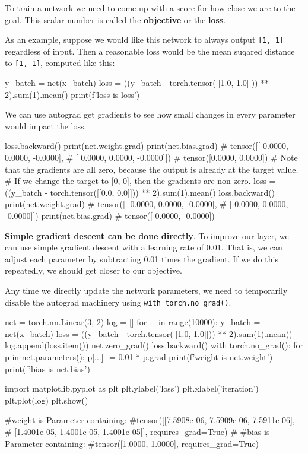 To train a network we need to come up with a score for how close we are to the goal. This scalar number is called the \textbf{objective} or the \textbf{loss}. 

As an example, suppose we would like this network to always output \texttt{[1, 1]} regardless of input. Then a reasonable loss would be the mean suqared distance to \texttt{[1, 1]}, computed like this:
\begin{codeblock}[language=python]
y_batch = net(x_batch)
loss = ((y_batch - torch.tensor([[1.0, 1.0]])) ** 2).sum(1).mean()
print(f'loss is {loss}')
\end{codeblock}

We can use autograd get gradients to see how small changes in every parameter would impact the loss. 

\begin{codeblock}[language=python]
loss.backward()
print(net.weight.grad)
print(net.bias.grad)
# tensor([[ 0.0000,  0.0000, -0.0000],
#        [ 0.0000,  0.0000, -0.0000]])
# tensor([0.0000, 0.0000])
# Note that the gradients are all zero, because the output is already at the target value.
# If we change the target to [0, 0], then the gradients are non-zero.
loss = ((y_batch - torch.tensor([[0.0, 0.0]])) ** 2).sum(1).mean()
loss.backward()
print(net.weight.grad)
# tensor([[ 0.0000,  0.0000, -0.0000],
#        [ 0.0000,  0.0000, -0.0000]])
print(net.bias.grad)
# tensor([-0.0000, -0.0000])
\end{codeblock}

\textbf{Simple gradient descent can be done directly}. To improve our layer, we can use simple gradient descent with a learning rate of 0.01. That is, we can adjust each parameter by subtracting 0.01 times the gradient. If we do this repeatedly, we should get closer to our objective. 

Any time we directly update the network parameters, we need to temporarily disable the autograd machinery using \texttt{with torch.no\_grad()}.

\begin{codeblock}[language=python]
net = torch.nn.Linear(3, 2)
log = []
for _ in range(10000):
    y_batch = net(x_batch)
    loss = ((y_batch - torch.tensor([[1.0, 1.0]])) ** 2).sum(1).mean()
    log.append(loss.item())
    net.zero_grad()
    loss.backward()
    with torch.no_grad():
        for p in net.parameters():
            p[...] -= 0.01 * p.grad
print(f'weight is {net.weight}\n')
print(f'bias is {net.bias}\n')

import matplotlib.pyplot as plt
plt.ylabel('loss')
plt.xlabel('iteration')
plt.plot(log)
plt.show()

#weight is Parameter containing:
#tensor([[7.5908e-06, 7.5909e-06, 7.5911e-06],
#        [1.4001e-05, 1.4001e-05, 1.4001e-05]], requires_grad=True)
#
#bias is Parameter containing:
#tensor([1.0000, 1.0000], requires_grad=True)
\end{codeblock}

